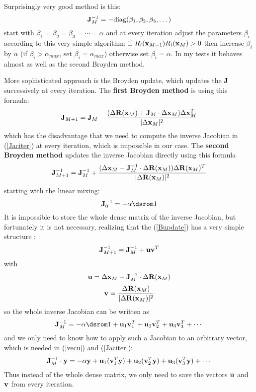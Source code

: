Surprisingly very good method is this: 
\begin{equation}
  {\bf J}_M^{-1}=-{\rm diag}(\beta_1,\beta_2,\beta_3,\dots)\label{exciting}
\end{equation}
start with $\beta_1=\beta_2=\beta_3=\cdots=\alpha$ and at every iteration adjust the parameters $\beta_i$ according to this very simple algorithm: if $R_i({\bf x}_{M-1})R_i({\bf x}_M)>0$ then increase $\beta_i$ by $\alpha$ (if $\beta_i>\alpha_{max}$, set $\beta_i=\alpha_{max}$) otherwise set $\beta_i=\alpha$. In my tests it behaves almost as well as the second Broyden method.

More sophisticated approach is the Broyden update, which updates the ${\bf J}$ successively at every iteration. The \textbf{first Broyden method} is using this formula: 
\begin{equation*}
  {\bf J}_{M+1}={\bf J}_M-{(\Delta{\bf R}({\bf x}_M)+{\bf J}_M\cdot\Delta{\bf x}_M)\Delta{\bf x}_M^T\over |\Delta{\bf x}_M|^2}
\end{equation*}
which has the disadvantage that we need to compute the inverse Jacobian in (\ref{Jaciter}) at every iteration, which is impossible in our case. The \textbf{second Broyden method} updates the inverse Jacobian directly using this formula 
\begin{equation}
  {\bf J}_{M+1}^{-1}={\bf J}_M^{-1}+{(\Delta{\bf x}_M-{\bf J}_M^{-1}\cdot\Delta{\bf R}({\bf x}_M)) \Delta{\bf R}({\bf x}_M)^T\over |\Delta{\bf R}({\bf x}_M)|^2}  \label{Bupdate}
\end{equation}
starting with the linear mixing: 
\begin{equation*}
  \J_0^{-1}=-\alpha\one
\end{equation*}
It is impossible to store the whole dense matrix of the inverse Jacobian, but fortunately it is not necessary, realizing that the (\ref{Bupdate}) has a very simple structure \cite{srivastava}: 
\begin{equation*}
  {\bf J}_{M+1}^{-1}={\bf J}_M^{-1}+{\bf u}{\bf v}^T
\end{equation*}
with 
\begin{equation}
  {\bf u}=\Delta{\bf x}_M-{\bf J}_M^{-1}\cdot\Delta{\bf R}({\bf x}_M)  \label{vecu}
\end{equation}
\begin{equation*}
  {\bf v}={\Delta{\bf R}({\bf x}_M)\over |\Delta{\bf R}({\bf x}_M)|^2}
\end{equation*}
so the whole inverse Jacobian can be written as 
\begin{equation*}
  \J_M^{-1}=-\alpha\one+{\bf u}_1{\bf v}_1^T+{\bf u}_2{\bf v}_2^T+ {\bf u}_3{\bf v}_3^T+\cdots
\end{equation*}
and we only need to know how to apply such a Jacobian to an arbitrary vector, which is needed in (\ref{vecu}) and (\ref{Jaciter}): 
\begin{equation*}
  {\bf J}_M^{-1}\cdot{\bf y}=-\alpha{\bf y}+{\bf u}_1({\bf v}_1^T{\bf y}) +{\bf u}_2({\bf v}_2^T{\bf y})+ {\bf u}_3({\bf v}_3^T{\bf y})+\cdots
\end{equation*}
Thus instead of the whole dense matrix, we only need to save the vectors ${\bf u}$ and ${\bf v}$ from every iteration.

